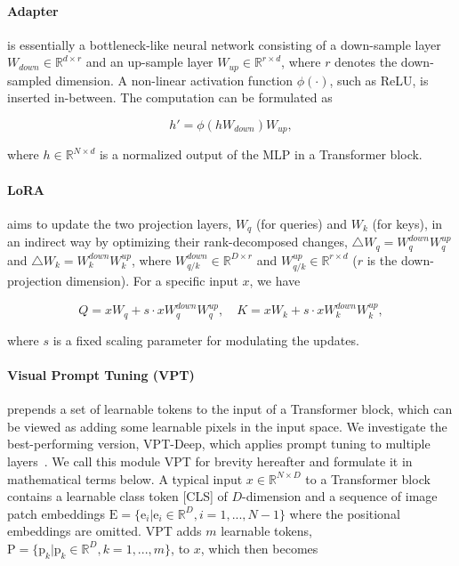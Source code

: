 \paragraph{Adapter}
is essentially a bottleneck-like neural network consisting of a down-sample layer $W_{down} \in \mathbb{R}^{d\times r}$ and an up-sample layer $W_{up} \in \mathbb{R}^{r\times d}$, where $r$ denotes the down-sampled dimension. A non-linear activation function $\phi(\cdot)$, such as ReLU, is inserted in-between. The computation can be formulated as

\begin{equation}
\label{eqn:adapter}
    h' =  \phi(h W_{down}) W_{up},
\end{equation}

where $h \in \mathbb{R}^{N \times d}$ is a normalized output of the MLP in a Transformer block.

\paragraph{LoRA}
aims to update the two projection layers, $W_q$ (for queries) and $W_k$ (for keys), in an indirect way by optimizing their rank-decomposed changes, $\bigtriangleup W_q = W_{q}^{down}W_{q}^{up}$ and $\bigtriangleup W_k = W_{k}^{down}W_{k}^{up}$, where $W_{q/k}^{down} \in \mathbb{R}^{D \times r}$ and $W_{q/k}^{up} \in \mathbb{R}^{r \times d}$ ($r$ is the down-projection dimension). For a specific input $x$, we have

\begin{equation}
\label{eqn:lora}
    Q =  x W_q + s \cdot x W_{q}^{down} W_{q}^{up}, \quad
    K =  x W_k + s \cdot x W_{k}^{down} W_{k}^{up},
\end{equation}

where $s$ is a fixed scaling parameter for modulating the updates.

\paragraph{Visual Prompt Tuning (VPT)} prepends a set of learnable tokens to the input of a Transformer block, which can be viewed as adding some learnable pixels in the input space. We investigate the best-performing version, VPT-Deep, which applies prompt tuning to multiple layers~\cite{jia2022visual}. We call this module VPT for brevity hereafter and formulate it in mathematical terms below. A typical input $x \in \mathbb{R}^{N \times D}$ to a Transformer block contains a learnable class token [CLS] of $D$-dimension and a sequence of image patch embeddings $\text{E} = \{ \text{e}_i | \text{e}_i \in \mathbb{R}^D, i = 1, ..., N-1 \}$ where the positional embeddings are omitted. VPT adds $m$ learnable tokens, $\text{P} = \{ \text{p}_k | \text{p}_k \in \mathbb{R}^D, k = 1, ..., m \}$, to $x$, which then becomes

